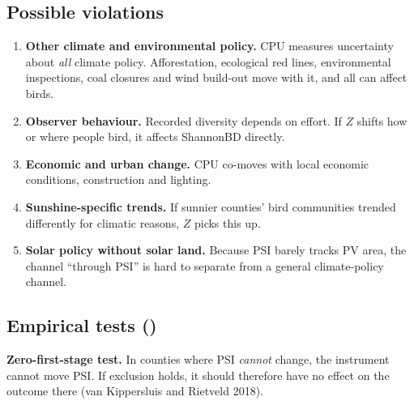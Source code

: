 \documentclass[11pt]{article}
\begin{document}
\subsection{Possible violations}
\begin{enumerate}
\item \textbf{Other climate and environmental policy.} CPU measures uncertainty about \emph{all} climate policy. Afforestation, ecological red lines, environmental inspections, coal closures and wind build-out move with it, and all can affect birds.
\item \textbf{Observer behaviour.} Recorded diversity depends on effort. If $Z$ shifts how or where people bird, it affects ShannonBD directly.
\item \textbf{Economic and urban change.} CPU co-moves with local economic conditions, construction and lighting.
\item \textbf{Sunshine-specific trends.} If sunnier counties' bird communities trended differently for climatic reasons, $Z$ picks this up.
\item \textbf{Solar policy without solar land.} Because PSI barely tracks PV area, the channel ``through PSI'' is hard to separate from a general climate-policy channel.
\end{enumerate}

\subsection{Empirical tests ()}
\textbf{Zero-first-stage test.} In counties where PSI \emph{cannot} change, the instrument cannot move PSI. If exclusion holds, it should therefore have no effect on the outcome there (van Kippersluis and Rietveld 2018).
\end{document}
